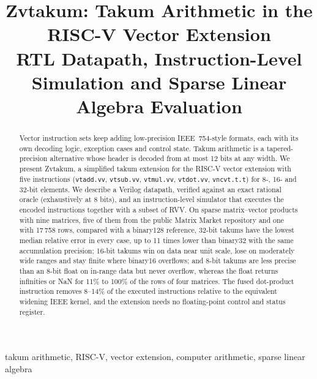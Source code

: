 \documentclass[conference]{IEEEtran}
\newcommand{\code}[1]{\texttt{#1}}
\begin{document}
\title{Zvtakum: Takum Arithmetic in the RISC-V Vector Extension\\
{\large RTL Datapath, Instruction-Level Simulation and Sparse Linear Algebra Evaluation}}

\author{
}

\maketitle

\begin{abstract}
Vector instruction sets keep adding low-precision IEEE~754-style formats, each with its own decoding
logic, exception cases and control state. Takum arithmetic is a tapered-precision alternative whose
header is decoded from at most 12 bits at any width. We present Zvtakum, a simplified takum extension
for the RISC-V vector extension with five instructions (\code{vtadd.vv}, \code{vtsub.vv},
\code{vtmul.vv}, \code{vtdot.vv}, \code{vncvt.t.t}) for 8-, 16- and 32-bit elements. We describe a
Verilog datapath, verified against an exact rational oracle (exhaustively at 8 bits), and an
instruction-level simulator that executes the encoded instructions together with a subset of RVV.
On sparse matrix--vector products with nine matrices, five of them from the public Matrix Market
repository and one with 17\,758 rows,
compared with a binary128 reference, 32-bit takums have the lowest median relative error in every case,
up to 11 times lower than binary32 with the same accumulation precision; 16-bit takums win on data near
unit scale, lose on moderately wide ranges and stay finite where binary16 overflows; and 8-bit takums are
less precise than an 8-bit float on in-range data but never overflow, whereas the float returns
infinities or NaN for 11\% to 100\% of the rows of four matrices. The fused dot-product instruction removes 8--14\%
of the executed instructions relative to the equivalent widening IEEE kernel, and the extension needs
no floating-point control and status register.
\end{abstract}

\begin{IEEEkeywords}
takum arithmetic, RISC-V, vector extension, computer arithmetic, sparse linear algebra
\end{IEEEkeywords}
\end{document}
